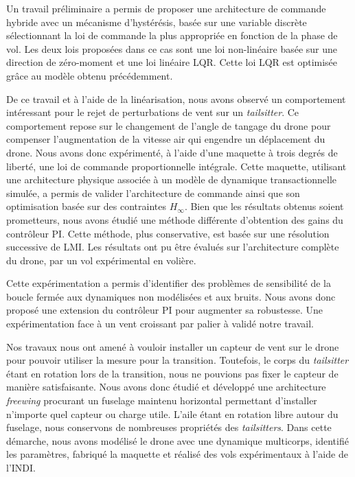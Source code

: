 Un travail préliminaire a permis de proposer une architecture de commande hybride avec un mécanisme d'hystérésis, basée sur une variable discrète sélectionnant la loi de commande la plus appropriée en fonction de la phase de vol. Les deux lois proposées dans ce cas sont une loi non-linéaire basée sur une direction de zéro-moment et une loi linéaire LQR. Cette loi LQR est optimisée grâce au modèle obtenu précédemment.

De ce travail et à l'aide de la linéarisation, nous avons observé un comportement intéressant pour le rejet de perturbations de vent sur un \textit{tailsitter}. Ce comportement repose sur le changement de l'angle de tangage du drone pour compenser l'augmentation de la vitesse air qui engendre un déplacement du drone. Nous avons donc expérimenté, à l'aide d'une maquette à trois degrés de liberté, une loi de commande proportionnelle intégrale. Cette maquette, utilisant une architecture physique associée à un modèle de dynamique transactionnelle simulée, a permis de valider l'architecture de commande ainsi que son optimisation basée sur des contraintes $H_{\infty}$.
Bien que les résultats obtenus soient prometteurs, nous avons étudié une méthode différente d'obtention des gains du contrôleur PI. Cette méthode, plus conservative, est basée sur une résolution successive de LMI. Les résultats ont pu être évalués sur l'architecture complète du drone, par un vol expérimental en volière.

Cette expérimentation a permis d'identifier des problèmes de sensibilité de la boucle fermée aux dynamiques non modélisées et aux bruits. Nous avons donc proposé une extension du contrôleur PI pour augmenter sa robustesse. Une expérimentation face à un vent croissant par palier à validé notre travail.

Nos travaux nous ont amené à vouloir installer un capteur de vent sur le drone pour pouvoir utiliser la mesure pour la transition. Toutefois, le corps du \textit{tailsitter} étant en rotation lors de la transition, nous ne pouvions pas fixer le capteur de manière satisfaisante. Nous avons donc étudié et développé une architecture \textit{freewing} procurant un fuselage maintenu horizontal permettant d'installer n'importe quel capteur ou charge utile. L'aile étant en rotation libre autour du fuselage, nous conservons de nombreuses propriétés des \textit{tailsitters}. Dans cette démarche, nous avons modélisé le drone avec une dynamique multicorps, identifié les paramètres, fabriqué la maquette et réalisé des vols expérimentaux à l'aide de l'INDI.

